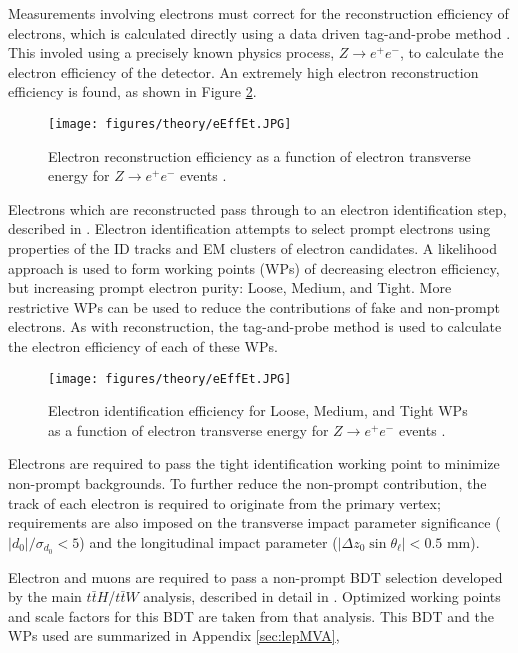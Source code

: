 Measurements involving electrons must correct for the reconstruction efficiency of electrons, which is calculated directly using a data driven tag-and-probe method \cite{tagAndProbe}. This involed using a precisely known physics process, $Z\rightarrow e^+e^-$, to calculate the electron efficiency of the detector. An extremely high electron reconstruction efficiency is found, as shown in Figure \ref{fig:eEffEt}.

\begin{figure}[H]
\centering
   \texttt{[image: figures/theory/eEffEt.JPG]}
\caption{Electron reconstruction efficiency as a function of electron transverse energy for $Z\rightarrow e^+e^-$ events \cite{tagAndProbe}.}
\label{fig:eEffEt}
\end{figure}

Electrons which are reconstructed pass through to an electron identification step, described in \cite{tagAndProbe}. Electron identification attempts to select prompt electrons using properties of the ID tracks and EM clusters of electron candidates.  A likelihood approach is used to form working points (WPs) of decreasing electron efficiency, but increasing prompt electron purity: Loose, Medium, and Tight. More restrictive WPs can be used to reduce the contributions of fake and non-prompt electrons. As with reconstruction, the tag-and-probe method is used to calculate the electron efficiency of each of these WPs. 

\begin{figure}[H]
\centering
   \texttt{[image: figures/theory/eEffEt.JPG]}
\caption{Electron identification efficiency for Loose, Medium, and Tight WPs as a function of electron transverse energy for $Z\rightarrow e^+e^-$ events \cite{tagAndProbe}.}
\label{fig:eEffEt}
\end{figure}

Electrons are required to pass the tight identification working point to minimize non-prompt backgrounds. To further reduce the non-prompt contribution, the track of each electron is required to originate from the primary vertex; requirements are also imposed on the transverse impact parameter significance ($|d_0|/\sigma_{d_0}<5$) and the longitudinal impact parameter ($|\Delta z_0 \sin \theta_\ell|<0.5$ mm).

Electron and muons are required to pass a non-prompt BDT selection developed by the main $t\bar{t}H$/$t\bar{t}W$ analysis, described in detail in \cite{ttH_paper}. Optimized working points and scale factors for this BDT are taken from that analysis. This BDT and the WPs used are summarized in Appendix \ref{sec:lepMVA},

